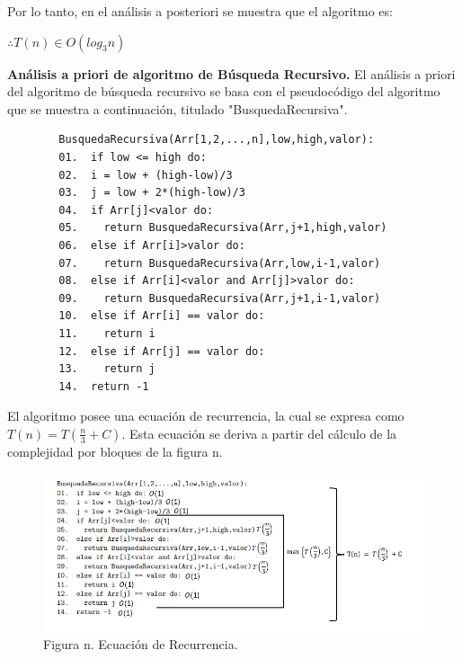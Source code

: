 \documentclass[12pt,twoside]{article}
\begin{document}
\medskip
Por lo tanto, en el análisis a posteriori se muestra que el algoritmo es:
\begin{center}
  $\therefore T(n)\in O(log_3n)$
\end{center}

\newpage


\textbf{Análisis a priori de algoritmo de Búsqueda Recursivo.} 
El análisis a priori del algoritmo de búsqueda recursivo se basa con el pseudocódigo del algoritmo que se muestra a continuación, titulado "BusquedaRecursiva". 
\par
\begin{center}
  \begin{verbatim}
        BusquedaRecursiva(Arr[1,2,...,n],low,high,valor):
        01.  if low <= high do:
        02.  i = low + (high-low)/3
        03.  j = low + 2*(high-low)/3
        04.  if Arr[j]<valor do:
        05.    return BusquedaRecursiva(Arr,j+1,high,valor)
        06.  else if Arr[i]>valor do:
        07.    return BusquedaRecursiva(Arr,low,i-1,valor)
        08.  else if Arr[i]<valor and Arr[j]>valor do:
        09.    return BusquedaRecursiva(Arr,j+1,i-1,valor)
        10.  else if Arr[i] == valor do:
        11.    return i
        12.  else if Arr[j] == valor do:
        13.    return j
        14.  return -1
  \end{verbatim}
  \end{center}
\par

El algoritmo posee una ecuación de recurrencia, la cual se expresa como $T(n)=T(\frac{n}{3}+C)$. Esta ecuación se deriva a  partir del cálculo de la complejidad por bloques de la figura n.

\begin{figure}[h]
  \begin{center}
    \includegraphics[width=0.85\linewidth]{images/apriori2.png}
    \\
    Figura n. Ecuación de Recurrencia.
  \end{center}
\end{figure}
\end{document}
